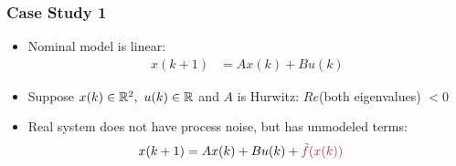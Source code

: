 \documentclass[aspectratio=169,handout]{beamer} 	%
\begin{document}
\begin{frame}
	\frametitle{Case Study 1}
	\begin{itemize}[<+->]
		\itemsep \baselineskip
		
		\item Nominal model is linear:
		\begin{align*}
			x(k + 1) &= A x(k) + B u(k)
		\end{align*}
		
		\item Suppose $x(k) \in \real[2], ~u(k) \in \real$ and $A$ is Hurwitz: 
		$Re$(both eigenvalues) $< 0$
		
		\item Real system does not have process noise, but has unmodeled terms:
		\begin{align*}
			x(k + 1) &= A x(k) + B u(k) + \mathalert{\tilde{f}(x(k))}
		\end{align*}
		
		
	\end{itemize}
	
\end{frame}
\end{document}
